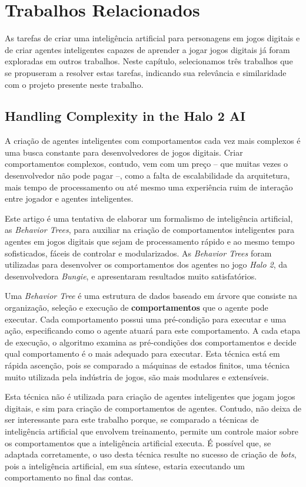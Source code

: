 \chapter{\label{chap:related-work}Trabalhos Relacionados}
As tarefas de criar uma inteligência artificial para personagens em jogos
digitais e de criar agentes inteligentes capazes de aprender a jogar jogos
digitais já foram exploradas em outros trabalhos. Neste capítulo, selecionamos
três trabalhos que se propuseram a resolver estas tarefas, indicando sua
relevância e similaridade com o projeto presente neste trabalho. 


\section{Handling Complexity in the Halo 2 AI}
A criação de agentes inteligentes com comportamentos cada vez mais complexos é
uma busca constante para desenvolvedores de jogos digitais. Criar comportamentos
complexos, contudo, vem com um preço -- que muitas vezes o desenvolvedor não
pode pagar --, como a falta de escalabilidade da arquitetura, mais tempo de
processamento ou até mesmo uma experiência ruim de interação entre jogador e
agentes inteligentes.

Este artigo é uma tentativa de elaborar um formalismo de inteligência
artificial, as \textit{Behavior Trees}, para auxiliar na criação de
comportamentos inteligentes para agentes em jogos digitais que sejam de
processamento rápido e ao mesmo tempo sofisticados, fáceis de controlar e
modularizados. As \textit{Behavior Trees} foram utilizadas para desenvolver os
comportamentos dos agentes no jogo \textit{Halo 2}, da desenvolvedora
\textit{Bungie}, e apresentaram resultados muito satisfatórios\cite{Halo2AI}.

Uma \textit{Behavior Tree} é uma estrutura de dados baseado em árvore que
consiste na organização, seleção e execução de \textbf{comportamentos} que o
agente pode executar. Cada comportamento possui uma pré-condição para executar e
uma ação, especificando como o agente atuará para este comportamento. A cada
etapa de execução, o algoritmo examina as pré-condições dos comportamentos e
decide qual comportamento é o mais adequado para executar. Esta técnica está em
rápida ascenção, pois se comparado a máquinas de estados finitos, uma técnica
muito utilizada pela indústria de jogos, são mais modulares e
extensíveis\cite{Rabin:2015:GAP:2821138}.

Esta técnica não é utilizada para criação de agentes inteligentes que jogam
jogos digitais, e sim para criação de comportamentos de agentes. Contudo, não
deixa de ser interessante para este trabalho porque, se comparado a técnicas de
inteligência artificial que envolvem treinamento, permite um controle maior
sobre os comportamentos que a inteligência artificial executa. É possível que,
se adaptada corretamente, o uso desta técnica resulte no sucesso de criação de
\textit{bots}, pois a inteligência artificial, em sua síntese, estaria
executando um comportamento no final das contas.


